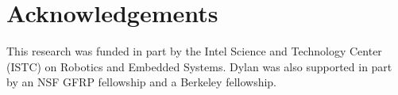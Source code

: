 \section*{Acknowledgements}
This research was funded in part by the Intel Science and Technology
Center (ISTC) on Robotics and Embedded Systems. Dylan was also
supported in part by an NSF GFRP fellowship and a Berkeley fellowship.
